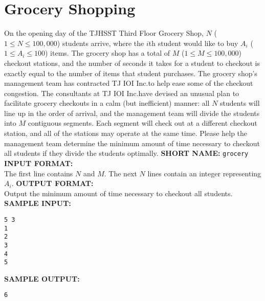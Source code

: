 \section{Grocery Shopping}

On the opening day of the TJHSST Third Floor Grocery Shop, $N$ ($1 \leq N \leq 100,000$) students arrive, where the $i$th student would like to buy $A_i$ ($1 \leq A_i \leq 100$) items. The grocery shop has a total of $M$ ($1 \leq M \leq 100,000$) checkout stations, and the number of seconds it takes for a student to checkout is exactly equal to the number of items that student purchases.
\blank
The grocery shop's management team has contracted TJ IOI Inc.\@ to help ease some of the checkout congestion.  The consultants at TJ IOI Inc.\@ have devised an unusual plan to facilitate grocery checkouts in a calm (but inefficient) manner: all $N$ students will line up in the order of arrival, and the management team will divide the students into $M$ contiguous segments. Each segment will check out at a different checkout station, and all of the stations may operate at the same time. Please help the management team determine the minimum amount of time necessary to checkout all students if they divide the students optimally.
\blank
\textbf{SHORT NAME:} \verb|grocery|
\blank
\textbf{INPUT FORMAT:}\\
The first line contains $N$ and $M$.
The next $N$ lines contain an integer representing $A_i$.
\blank
\textbf{OUTPUT FORMAT:}\\
Output the minimum amount of time necessary to checkout all students.
\blank
\textbf{SAMPLE INPUT:}
\begin{verbatim}
5 3
1
2
3
4
5
\end{verbatim}
\textbf{SAMPLE OUTPUT:}
\begin{verbatim}
6
\end{verbatim}
